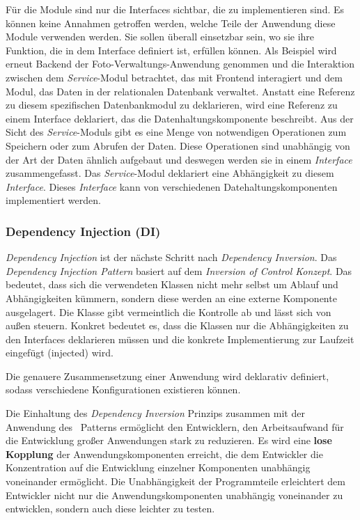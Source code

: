 \begin{itemize}
Für die Module sind nur die Interfaces sichtbar, die zu implementieren sind. Es können keine Annahmen getroffen werden, welche Teile der Anwendung diese Module verwenden werden. Sie sollen überall einsetzbar sein, wo sie ihre Funktion, die in dem Interface definiert ist, erfüllen können. Als Beispiel wird erneut Backend der Foto-Verwaltungs-Anwendung genommen und die Interaktion zwischen dem \textit{Service}-Modul betrachtet, das mit Frontend interagiert und dem Modul, das Daten in der relationalen Datenbank verwaltet. Anstatt eine Referenz zu diesem spezifischen Datenbankmodul zu deklarieren, wird eine Referenz zu einem Interface deklariert, das die Datenhaltungskomponente beschreibt. Aus der Sicht des \textit{Service}-Moduls gibt es eine Menge von notwendigen Operationen zum Speichern oder zum Abrufen der Daten. Diese Operationen sind unabhängig von der Art der Daten ähnlich aufgebaut und deswegen werden sie in einem \textit{Interface} zusammengefasst. Das \textit{Service}-Modul deklariert eine Abhängigkeit zu diesem \textit{Interface}. Dieses \textit{Interface} kann von verschiedenen Datehaltungskomponenten implementiert werden.

\end{itemize}

\subsubsection{Dependency Injection (DI)}\label{di}

\textit{Dependency Injection} ist der nächste Schritt nach \textit{Dependency Inversion}. Das \textit{Dependency Injection Pattern} basiert auf dem \textit{Inversion of Control Konzept}. Das bedeutet, dass sich die verwendeten Klassen nicht mehr selbst um Ablauf und Abhängigkeiten kümmern, sondern diese werden an eine externe Komponente ausgelagert. Die Klasse gibt vermeintlich die Kontrolle ab und lässt sich von außen steuern. Konkret bedeutet es, dass die Klassen nur die Abhängigkeiten zu den Interfaces deklarieren müssen und die konkrete Implementierung zur Laufzeit eingefügt (injected) wird. 

Die genauere Zusammensetzung einer Anwendung wird deklarativ definiert, sodass verschiedene Konfigurationen existieren können.

Die Einhaltung des \textit{Dependency Inversion} Prinzips zusammen mit der Anwendung des \di\ Patterns ermöglicht den Entwicklern, den Arbeitsaufwand für die Entwicklung großer Anwendungen stark zu reduzieren.
Es wird eine \textbf{lose Kopplung} der Anwendungskomponenten erreicht, die dem Entwickler die Konzentration auf die Entwicklung einzelner Komponenten unabhängig voneinander ermöglicht. Die Unabhängigkeit der Programmteile erleichtert dem Entwickler nicht nur die Anwendungskomponenten unabhängig voneinander zu entwicklen, sondern auch diese leichter zu testen. 

